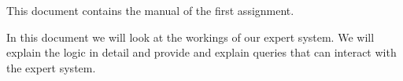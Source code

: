 This document contains the manual of the first assignment.

In this document we will look at the workings of our expert system.
We will explain the logic in detail and provide and explain
queries that can interact with the expert system.
